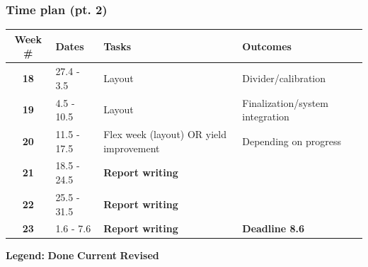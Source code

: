 \documentclass[t, screen, aspectratio=43]{beamer}
\begin{document}
\begin{frame}
	\frametitle{Time plan (pt. 2)}
	\begin{table}[htb!]
		\tiny
		\centering
		\vspace{-1em}
		\def\arraystretch{1.5}		
		\setlength\arrayrulewidth{0.75pt}
		\setlength{\tabcolsep}{1em} %
		\begin{tabular}{|c|l|l|l|}
			\hline 
			\rule[-1ex]{0pt}{2.5ex}\cellcolor{gray!40}\textbf{Week \#} & \cellcolor{gray!40}\textbf{Dates} &\cellcolor{gray!40}\textbf{Tasks} & \cellcolor{gray!40}\textbf{Outcomes}\\ 
			\hline 
			\rule[-1ex]{0pt}{2.5ex}\textbf{18}& 27.4 - 3.5 & Layout & Divider/calibration\\ 
			\hline 
			\rule[-1ex]{0pt}{2.5ex}\textbf{19}& 4.5 - 10.5 & Layout & Finalization/system integration\\ 
			\hline 
			\rule[-1ex]{0pt}{2.5ex}\textbf{20}& 11.5 - 17.5 & Flex week (layout) OR yield improvement & Depending on progress\\ 
			\hline 
			\rule[-1ex]{0pt}{2.5ex}\textbf{21}& 18.5 - 24.5& {\color{blue}\textbf{Report writing}} & \\ 
			\hline 
			\rule[-1ex]{0pt}{2.5ex}\textbf{22}& 25.5 - 31.5& {\color{blue}\textbf{Report writing}} & \\ 
			\hline 
			\rule[-1ex]{0pt}{2.5ex}\textbf{23}& 1.6 - 7.6& {\color{blue}\textbf{Report writing}} & {\color{red}\textbf{Deadline 8.6}}\\ 
			\hline 
		\end{tabular}
		\begin{flushleft}\textbf{Legend:} \colorbox{red!20}{\textbf{Done}} \colorbox{green!20}{\textbf{Current}}  \colorbox{blue!20}{\textbf{Revised}}
		\end{flushleft}
	\end{table}   
\end{frame}






\end{document}
